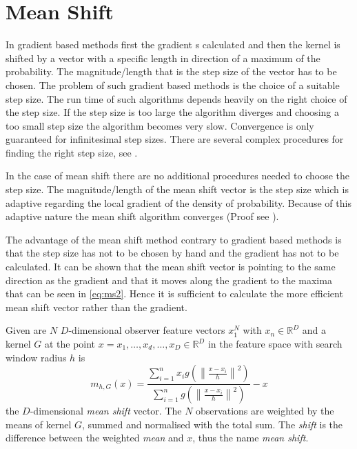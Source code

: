 \section{Mean Shift} %
\label{sec:mean_shift}
In gradient based methods first the gradient s calculated and then the
kernel is shifted by a vector with a specific length in direction of a
maximum of the probability. The magnitude/length that is the step size
of the vector has to be chosen. The problem of such gradient based
methods is the choice of a suitable step size. The run time of such
algorithms depends heavily on the right choice of the step size. If
the step size is too large the algorithm diverges and choosing a too
small step size the algorithm becomes very slow. Convergence is only
guaranteed for infinitesimal step sizes. There are several complex
procedures for finding the right step size, see
\citeauthor{citeulike:462300} \citep{citeulike:462300}.

In the case of mean shift there are no additional procedures needed to
choose the step size. The magnitude/length of the mean shift vector is
the step size which is adaptive regarding the local gradient of the
density of probability.  Because of this adaptive nature the mean
shift algorithm converges (Proof see \citeauthor{citeulike:462300}
\citep{citeulike:462300}).

The advantage of the mean shift method contrary to gradient based
methods is that the step size has not to be chosen by hand and the
gradient has not to be calculated. It can be shown that the mean shift
vector is pointing to the same direction as the gradient and that it
moves along the gradient to the maxima that can be seen in
\autoref{eq:ms2}. Hence it is sufficient to calculate the more
efficient mean shift vector rather than the gradient.

Given are $N$ $D$-dimensional observer feature vectors $x_1^N$ with
$x_n \in \mathbb{R}^D$ and a kernel $G$ at the point $x = {x_1, \ldots
  , x_d, \ldots , x_D} \in \mathbb{R}^D$ in the feature space with
search window radius $h$ is
\begin{equation}\label{eq:ms0}
  m_{h,G}(x) = \frac{\sum_{i=1}^n x_i g\left(\left\lVert \frac{x - x_i}{h}
      \right\rVert^2\right)}{\sum_{i=1}^n g\left(\left\lVert \frac{x - x_i}{h}
      \right\rVert^2\right)} -x
\end{equation}
the $D$-dimensional \textit{mean shift} vector. The $N$ observations
are weighted by the means of kernel $G$, summed and normalised with
the total sum.  The \emph{shift} is the difference between the
weighted \emph{mean} and $x$, thus the name \emph{mean shift}.

